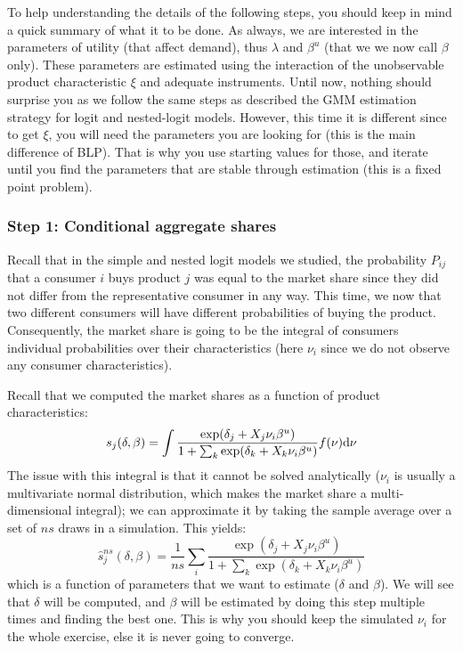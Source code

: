 To help understanding the details of the following steps, you should keep in mind a quick summary of what it to be done. As always, we are interested in the parameters of utility (that affect demand), thus $\lambda$ and $\beta^u$ (that we we now call $\beta$ only). These parameters are estimated using the interaction of the unobservable product characteristic $\xi$ and adequate instruments. Until now, nothing should surprise you as we follow the same steps as described the GMM estimation strategy for logit and nested-logit models. However, this time it is different since to get $\xi$, you will need the parameters you are looking for (this is the main difference of BLP). That is why you use starting values for those, and iterate until you find the parameters that are stable through estimation (this is a fixed point problem).

\subsubsection{Step 1: Conditional aggregate shares}

Recall that in the simple and nested logit models we studied, the probability $P_{ij}$ that a consumer $i$ buys product $j$ was equal to the market share since they did not differ from the representative consumer in any way. This time, we now that two different consumers will have different probabilities of buying the product. Consequently, the market share is going to be the integral of consumers individual probabilities over their characteristics (here $\nu_i$ since we do not observe any consumer characteristics).

Recall that we computed the market shares as a function of product characteristics: $$s_j(\delta, \beta) = \int \frac{\exp(\delta_j + X_j\nu_i\beta^u)}{1 + \sum_k \exp(\delta_k + X_k\nu_i\beta^u) } f(\nu) \mathrm{d}\nu $$
The issue with this integral is that it cannot be solved analytically ($\nu_i$ is usually a multivariate normal distribution, which makes the market share a multi-dimensional integral); we can approximate it by taking the sample average over a set of $ns$ draws in a simulation. This yields: $$\hat s_j^{ns}(\delta, \beta) = \frac{1}{ns} \sum_{i} \frac{\exp(\delta_j + X_j\nu_i\beta^u)}{1 + \sum_k \exp(\delta_k + X_k\nu_i\beta^u) } $$ which is a function of parameters that we want to estimate ($\delta$ and $\beta$). We will see that $\delta$ will be computed, and $\beta$ will be estimated by doing this step multiple times and finding the best one. This is why you should keep the simulated $\nu_i$ for the whole exercise, else it is never going to converge.

